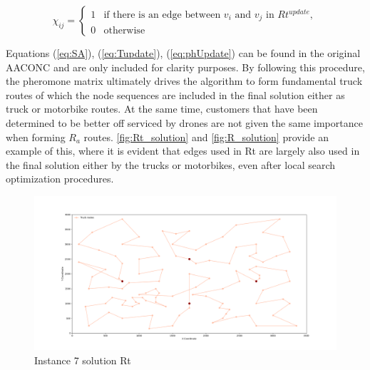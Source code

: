\documentclass{article}
\begin{document}
	\begin{equation}
		\chi_{ij} = 
		\begin{cases}
			1 & \text{if there is an edge between }v_i \text{ and }v_j \text{ in }Rt^{update},\\
			0 & \text{otherwise}
		\end{cases}
		\label{eq:diff}
	\end{equation}

	Equations (\ref{eq:SA}), (\ref{eq:Tupdate}), (\ref{eq:phUpdate}) can be found in the original AACONC and are only included for clarity purposes. By following this procedure, the pheromone matrix ultimately drives the algorithm to form fundamental truck routes of which the node sequences are included in the final solution either as truck or motorbike routes. At the same time, customers that have been determined to be better off serviced by drones are not given the same importance when forming $R_a$ routes. \autoref{fig:Rt_solution} and \ref{fig:R_solution} provide an example of this, where it is evident that edges used in Rt are largely also used in the final solution either by the trucks or motorbikes, even after local search optimization procedures.
	\begin{figure}[h]
		\centering
		\begin{minipage}{\columnwidth}
			\centering
			\includegraphics[scale=0.2]{p07-15-15-15_best_solution_TRUCK}\;
			\caption{Instance 7 solution Rt}
			\label{fig:Rt_solution}
		\end{minipage}
	\end{figure}
\end{document}
